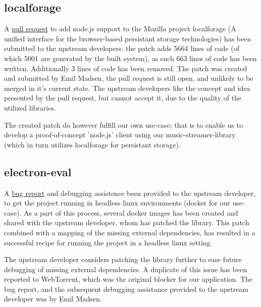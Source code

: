 \subsection{localforage}
\label{subsec:appendix-localforage}
A \href{https://github.com/mozilla/localForage/pull/551}{pull request} to add 
node.js support to the Mozilla project localforage (A unified interface for 
the browser-based persistant storage technologies) has been submitted to the
upstream developers: the patch adds 5664 lines of code (of which 5001 are 
generated by the built system), as such 663 lines of code has been written.
Additionally 3 lines of code has been removed.
\newline\newline
The patch was created and submitted by Emil Madsen, the pull request is still
open, and unlikely to be merged in it's current state. The upstream developers
like the concept and idea presented by the pull request, but cannot accept it,
due to the quality of the utilized libraries.

The created patch do however fulfill our own use-case; that is to enable us to 
develop a proof-of-concept 'node.js' client using our music-streamer-library
(which in turn utilizes localforage for persistant storage).

\subsection{electron-eval}
\label{subsec:appendix-electron-eval}
A \href{https://github.com/mappum/electron-eval/issues/29}{bug report} and 
debugging assistence been provided to the upstream developer, to get the project
running in headless linux environments (docker for our use-case).
\newline\newline
As a part of this process, several docker images has been created and shared
with the upstream developer, whom has patched the library. This patch combined
with a mapping of the missing external dependencies, has resulted in a
successful recipe for running the project in a headless linux setting.

The upstream developer considers patching the library further to ease future 
debugging of missing external dependencies. A duplicate of this issue has been
reported to WebTorrent, which was the original blocker for our application.
\newline\newline
The bug report, and the subsequent debugging assistance provided to the
upstream developer was by Emil Madsen.

